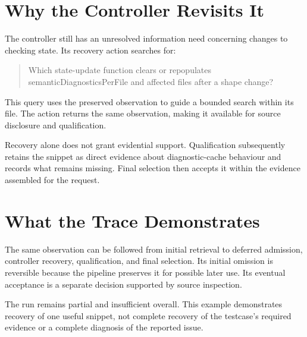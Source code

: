 \section{Why the Controller Revisits It}\label{sec:why-the-controller-revisits-it}

The controller still has an unresolved information need concerning changes to checking state. Its recovery action searches for:

\begin{quote}
Which state-update function clears or repopulates semanticDiagnosticsPerFile and affected files after a shape change?
\end{quote}

This query uses the preserved observation to guide a bounded search within its file. The action returns the same observation, making it available for source disclosure and qualification.

Recovery alone does not grant evidential support. Qualification subsequently retains the snippet as direct evidence about diagnostic-cache behaviour and records what remains missing. Final selection then accepts it within the evidence assembled for the request.

\section{What the Trace Demonstrates}\label{sec:what-the-trace-demonstrates}

The same observation can be followed from initial retrieval to deferred admission, controller recovery, qualification, and final selection. Its initial omission is reversible because the pipeline preserves it for possible later use. Its eventual acceptance is a separate decision supported by source inspection.

The run remains partial and insufficient overall. This example demonstrates recovery of one useful snippet, not complete recovery of the testcase's required evidence or a complete diagnosis of the reported issue.
